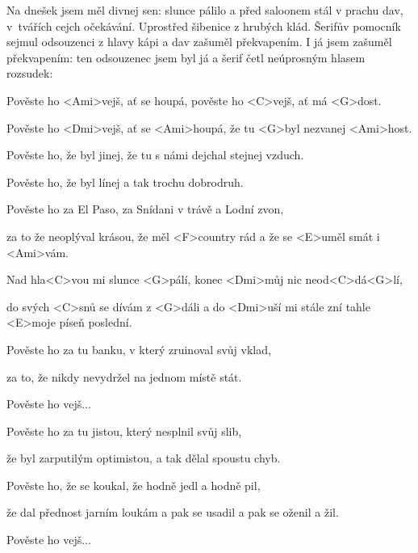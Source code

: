 

Na dnešek jsem měl divnej sen: slunce pálilo a před saloonem stál v prachu dav, v~tvářích cejch očekávání.
Uprostřed šibenice z hrubých klád.
Šerifův pomocník sejmul odsouzenci z hlavy kápi a dav zašuměl překvapením.
I já jsem zašuměl překvapením: ten odsouzenec jsem byl já
a šerif četl neúprosným hlasem rozsudek:

\zs
Pověste ho <Ami>vejš, ať se houpá,
pověste ho <C>vejš, ať má <G>dost.

Pověste ho <Dmi>vejš, ať se <Ami>houpá,
že tu <G>byl nezvanej <Ami>host.
\ks

\zs
Pověste ho, že byl jinej,
že tu s námi dejchal stejnej vzduch.

Pověste ho, že byl línej
a tak trochu dobrodruh.
\ks

\zs
Pověste ho za El Paso,
za Snídani v trávě a Lodní zvon,

za to že neoplýval krásou,
že měl <F>country rád a že se <E>uměl smát i <Ami>vám.
\ks

\zr
Nad hla<C>vou mi slunce <G>pálí,
konec <Dmi>můj nic neod<C>dá<G>lí,

do svých <C>snů se dívám z <G>dáli
a do <Dmi>uší mi stále zní tahle <E>moje píseň poslední.
\kr

\zs
Pověste ho za tu banku,
v který zruinoval svůj vklad,

za to, že nikdy nevydržel
na jednom místě stát.
\ks

\zr \kr

\zs
Pověste ho vejš...
\ks

\zs
Pověste ho za tu jistou,
který nesplnil svůj slib,

že byl zarputilým optimistou,
a tak dělal spoustu chyb.
\ks

\zs
Pověste ho, že se koukal,
že hodně jedl a hodně pil,

že dal přednost jarním loukám
a pak se usadil a pak se oženil
a žil.
\ks

\zs
Pověste ho vejš...
\ks
\kp
